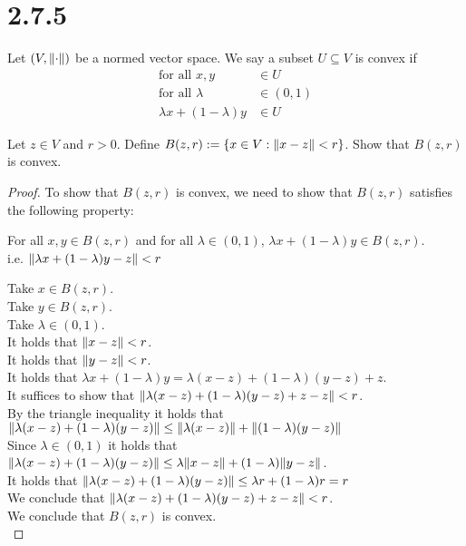 \documentclass{article}
\theoremstyle{mytheoremstyle}
\theoremstyle{mytheoremstyle}
\theoremstyle{myproblemstyle}
\begin{document}
    \newpage

    \section{2.7.5}
    \begin{problem}
        Let $(V, \norm{\cdot})$ be a normed vector space. We say a subset $U \subseteq V$ is convex if
        \begin{align*}
            \text{for all } x,y &\in U \\
            \text{for all } \lambda &\in (0,1) \\
            \lambda x + (1 - \lambda)y &\in U
        \end{align*}

        Let $z \in V$ and $r > 0$. Define $B(z,r) := \{x \in V: \norm{x - z} < r\}$. Show that $B(z,r)$ is convex.
    \end{problem}

    \begin{proof}
        To show that $B(z,r)$ is convex, we need to show that $B(z,r)$ satisfies the following property:
        \begin{center}
            For all $x,y \in B(z,r)$ and for all $\lambda \in (0,1)$, $\lambda x + (1 - \lambda)y \in B(z,r)$. \\
            i.e. $\norm{\lambda x + (1 - \lambda)y - z} < r$
        \end{center}
        Take $x \in B(z,r)$. \\
        Take $y \in B(z,r)$. \\
        Take $\lambda \in (0,1)$. \\
        It holds that $\norm{x - z} < r$. \\
        It holds that $\norm{y - z} < r$. \\
        It holds that $\lambda x + (1 - \lambda)y = \lambda (x - z) + (1 - \lambda)(y - z) + z$. \\
        It suffices to show that $\norm{\lambda (x - z) + (1 - \lambda)(y - z) + z - z} < r$. \\
        By the triangle inequality it holds that $\norm{\lambda(x-z) + (1-\lambda)(y-z)} \le \norm{\lambda(x-z)} + \norm{(1-\lambda)(y-z)}$ \\
        Since $\lambda \in (0,1)$ it holds that $\norm{\lambda(x-z) + (1-\lambda)(y-z)} \le \lambda\norm{x-z} + (1-\lambda)\norm{y-z}$. \\
        It holds that $\norm{\lambda(x-z) + (1-\lambda)(y-z)} \le \lambda r + (1-\lambda)r = r$ \\
        We conclude that $\norm{\lambda (x - z) + (1 - \lambda)(y - z) + z - z} < r$. \\
        We conclude that $B(z,r)$ is convex. \\
    \end{proof}
\end{document}
